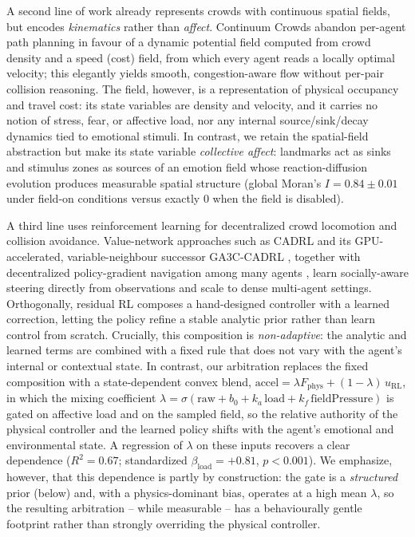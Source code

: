 \documentclass[sigconf,nonacm]{acmart}
\begin{document}
A second line of work already represents crowds with continuous spatial fields, but encodes \emph{kinematics} rather than \emph{affect}. Continuum Crowds \citep{treuille2006} abandon per-agent path planning in favour of a dynamic potential field computed from crowd density and a speed (cost) field, from which every agent reads a locally optimal velocity; this elegantly yields smooth, congestion-aware flow without per-pair collision reasoning. The field, however, is a representation of physical occupancy and travel cost: its state variables are density and velocity, and it carries no notion of stress, fear, or affective load, nor any internal source/sink/decay dynamics tied to emotional stimuli. In contrast, we retain the spatial-field abstraction but make its state variable \emph{collective affect}: landmarks act as sinks and stimulus zones as sources of an emotion field whose reaction-diffusion evolution produces measurable spatial structure (global Moran's $I = 0.84 \pm 0.01$ under field-on conditions versus exactly $0$ when the field is disabled).

A third line uses reinforcement learning for decentralized crowd locomotion and collision avoidance. Value-network approaches such as CADRL \citep{chen2017cadrl} and its GPU-accelerated, variable-neighbour successor GA3C-CADRL \citep{everett2018gacadrl}, together with decentralized policy-gradient navigation among many agents \citep{long2018}, learn socially-aware steering directly from observations and scale to dense multi-agent settings. Orthogonally, residual RL \citep{johannink2019} composes a hand-designed controller with a learned correction, letting the policy refine a stable analytic prior rather than learn control from scratch. Crucially, this composition is \emph{non-adaptive}: the analytic and learned terms are combined with a fixed rule that does not vary with the agent's internal or contextual state. In contrast, our arbitration replaces the fixed composition with a state-dependent convex blend, $\text{accel} = \lambda F_{\text{phys}} + (1-\lambda)\, u_{\text{RL}}$, in which the mixing coefficient $\lambda = \sigma(\text{raw} + b_0 + k_a\,\text{load} + k_f\,\text{fieldPressure})$ is gated on affective load and on the sampled field, so the relative authority of the physical controller and the learned policy shifts with the agent's emotional and environmental state. A regression of $\lambda$ on these inputs recovers a clear dependence ($R^2 = 0.67$; standardized $\beta_{\text{load}} = +0.81$, $p<0.001$). We emphasize, however, that this dependence is partly by construction: the gate is a \emph{structured} prior (below) and, with a physics-dominant bias, operates at a high mean $\lambda$, so the resulting arbitration -- while measurable -- has a behaviourally gentle footprint rather than strongly overriding the physical controller.
\end{document}
